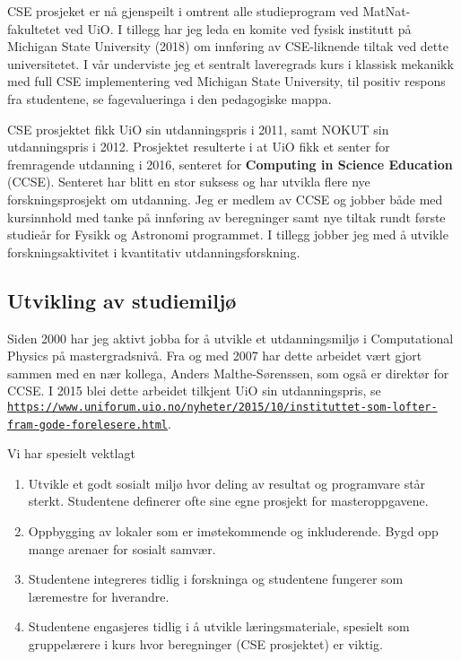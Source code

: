 \documentclass[aps,floatfix,preprint]{revtex4-1}
\begin{document}
CSE prosjeket er nå gjenspeilt i omtrent alle studieprogram ved
MatNat-fakultetet ved UiO. I tillegg har jeg leda en komite ved fysisk
institutt på Michigan State University (2018) om innføring av
CSE-liknende tiltak ved dette universitetet. I vår underviste jeg et
sentralt laveregrads kurs i klassisk mekanikk med full CSE
implementering ved Michigan State University, til positiv respons fra
studentene, se fagevalueringa i den pedagogiske mappa.

CSE prosjektet fikk UiO sin utdanningspris i 2011, samt NOKUT sin
utdanningspris i 2012. Prosjektet resulterte i at UiO fikk et senter
for fremragende utdanning i 2016, senteret for \textbf{Computing in
  Science Education} (CCSE). Senteret har blitt en stor suksess og har
utvikla flere nye forskningsprosjekt om utdanning.  Jeg er medlem av
CCSE og jobber både med kursinnhold med tanke på innføring av
beregninger samt nye tiltak rundt første studieår for Fysikk og
Astronomi programmet. I tillegg jobber jeg med å utvikle
forskningsaktivitet i kvantitativ utdanningsforskning.

\subsection*{Utvikling av studiemiljø}

Siden 2000 har jeg aktivt jobba for å utvikle et utdanningsmiljø i
Computational Physics på mastergradsnivå.  Fra og med  2007 har dette arbeidet vært
gjort sammen med en nær kollega, Anders Malthe-Sørenssen, som også er
direktør for CCSE. I 2015 blei dette arbeidet tilkjent UiO sin
utdanningspris, se
\href{{https://www.uniforum.uio.no/nyheter/2015/10/instituttet-som-lofter-fram-gode-forelesere.html}}{\nolinkurl{https://www.uniforum.uio.no/nyheter/2015/10/instituttet-som-lofter-fram-gode-forelesere.html}}.

Vi har spesielt vektlagt
\begin{enumerate}
\item Utvikle et godt sosialt miljø hvor deling av resultat og programvare står sterkt. Studentene definerer ofte sine egne prosjekt for masteroppgavene.

\item Oppbygging av lokaler som er imøtekommende og inkluderende. Bygd opp mange arenaer for sosialt samvær.

\item Studentene integreres tidlig i forskninga og studentene fungerer som læremestre for hverandre.

\item Studentene engasjeres tidlig i å utvikle læringsmateriale, spesielt som gruppelærere i kurs hvor beregninger (CSE prosjektet) er viktig.
\end{enumerate}
\end{document}
